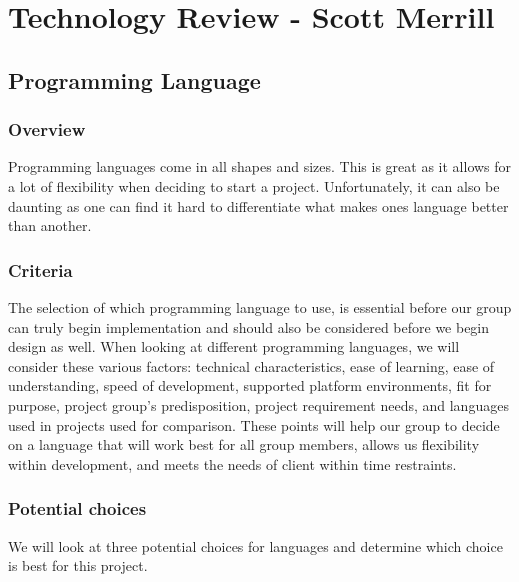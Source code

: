 
\chapter{Technology Review - Scott Merrill}

\section{ Programming Language }

\subsection{ Overview }
Programming languages come in all shapes and sizes. This is great as it allows for a lot of flexibility when deciding to start a project. Unfortunately, it can also be daunting as one can find it hard to differentiate what makes ones language better than another.  

\subsection{ Criteria }
The selection of which programming language to use, is essential before our group can truly begin implementation and should also be considered before we begin design as well. When looking at different programming languages, we will consider these various factors: technical characteristics, ease of learning, ease of understanding, speed of development, supported platform environments, fit for purpose, project group’s predisposition, project requirement needs, and languages used in projects used for comparison. 
These points will help our group to decide on a language that will work best for all group members, allows us flexibility within development, and meets the needs of client within time restraints. 


\subsection{ Potential choices }
We will look at three potential choices for languages and determine which choice is best for this project. 

